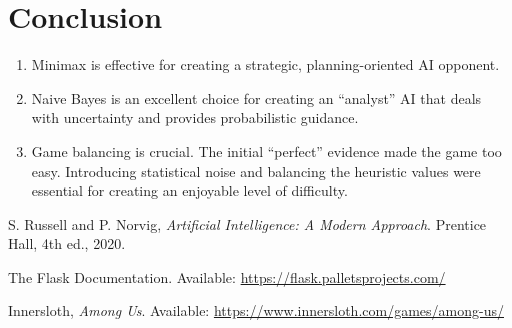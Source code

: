 \documentclass{article}
\begin{document}
\section{Conclusion}
\begin{enumerate}
    \item Minimax is effective for creating a strategic, planning-oriented AI opponent.
    \item Naive Bayes is an excellent choice for creating an ``analyst'' AI that deals with uncertainty and provides probabilistic guidance.
    \item Game balancing is crucial. The initial ``perfect'' evidence made the game too easy. Introducing statistical noise and balancing the heuristic values were essential for creating an enjoyable level of difficulty.
\end{enumerate}

\begin{thebibliography}{9}
    S. Russell and P. Norvig, \textit{Artificial Intelligence: A Modern Approach}. Prentice Hall, 4th ed., 2020.

    The Flask Documentation. Available: \url{https://flask.palletsprojects.com/}

    Innersloth, \textit{Among Us}. Available: \url{https://www.innersloth.com/games/among-us/}
\end{thebibliography}
\end{document}
